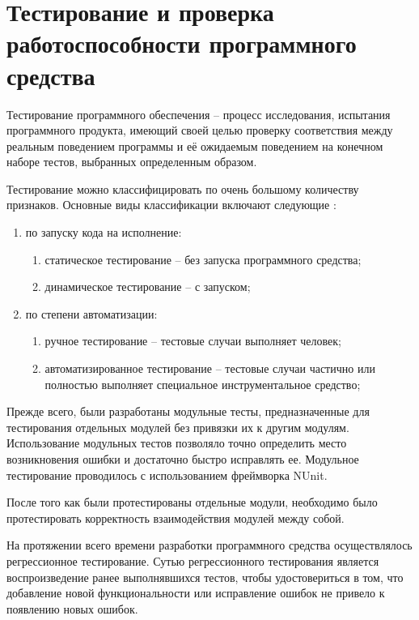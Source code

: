 \section{Тестирование и проверка работоспособности программного средства}
\label{sec:testing}

Тестирование программного обеспечения -- процесс исследования, испытания программного продукта, имеющий своей целью проверку соответствия между реальным поведением программы и её ожидаемым поведением на конечном наборе тестов, выбранных определенным образом.

Тестирование можно классифицировать по очень большому количеству признаков. Основные виды классификации включают следующие \cite{kulikov_testing}:

\begin{enumerate}
	\item по запуску кода на исполнение:
	\begin{enumerate}
		\item статическое тестирование -- без запуска программного средства;
		\item динамическое тестирование -- с запуском;
	\end{enumerate}
	\item по степени автоматизации:
	\begin{enumerate}
		\item ручное тестирование -- тестовые случаи выполняет человек;
		\item автоматизированное тестирование -- тестовые случаи частично или полностью выполняет специальное инструментальное средство;
	\end{enumerate}
\end{enumerate}

Прежде  всего,  были  разработаны  модульные  тесты,  предназначенные для  тестирования  отдельных  модулей  без  привязки  их  к  другим  модулям. Использование модульных тестов позволяло точно определить место возникновения ошибки и достаточно быстро исправлять ее. Модульное тестирование проводилось с использованием фреймворка NUnit. 

После того как были протестированы отдельные модули, необходимо было  протестировать  корректность  взаимодействия  модулей  между  собой. 

На протяжении всего времени разработки программного средства осуществлялось регрессионное тестирование. Сутью регрессионного тестирования является воспроизведение ранее выполнявшихся тестов, чтобы удостовериться  в  том,  что  добавление  новой  функциональности или  исправление ошибок не привело к появлению новых ошибок.

